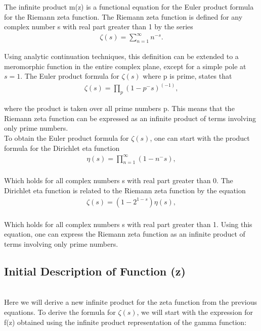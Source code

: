 \documentclass{article}
\begin{document}
The infinite product m(z) is a functional equation for the Euler product formula for the Riemann zeta function. The Riemann zeta function is defined for any complex number s with real part greater than 1 by the series \\

\begin{align*}
\zeta(s) = \sum_{n=1}^\infty n^{-s}.
\end{align*}

Using analytic continuation techniques, this definition can be extended to a meromorphic function in the entire complex plane, except for a simple pole at $s=1$. The Euler product formula for $\zeta\left(s\right)$ where p is prime, states that \\

\begin{align*}
\zeta(s) = \prod_{p} \left(1 - p^-s\right)^\left(-1\right),
\end{align*}

where the product is taken over all prime numbers p. This means that the Riemann zeta function can be expressed as an infinite product of terms involving only prime numbers. \\

To obtain the Euler product formula for $\zeta\left(s\right)$, one can start with the product formula for the Dirichlet eta function \\

\begin{align*}
\eta(s) = \prod_{n=1}^\infty \left(1 - n^-s\right), \\
\end{align*}

Which holds for all complex numbers s with real part greater than 0. The Dirichlet eta function is related to the Riemann zeta function by the equation \\

\begin{align*}
\zeta(s) = \left(1 - 2^{1-s}\right) \eta\left(s\right), \\
\end{align*}

Which holds for all complex numbers s with real part greater than 1. Using this equation, one can express the Riemann zeta function as an infinite product of terms involving only prime numbers. \\

\subsection*{Initial Description of Function \zeta(z)} \\
Here we will derive a new infinite product for the zeta function from the previous equations. To derive the formula for $\zeta(s)$, we will start with the expression for f(z) obtained using the infinite product representation of the gamma function: \\
\end{document}
